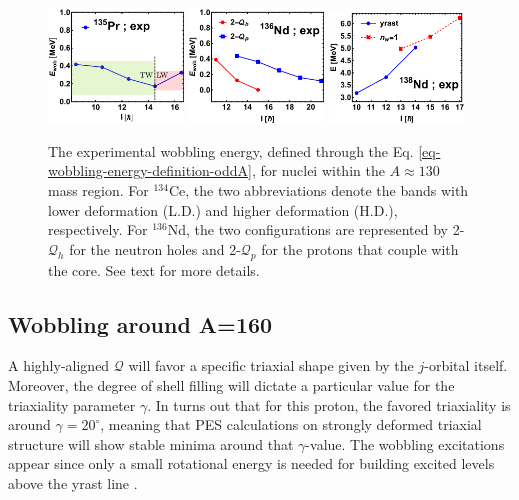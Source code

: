 \begin{figure}
    \includegraphics[width=0.32\textwidth]{Chapters/Figures/wobblers/135Pr-edited.pdf}
    \includegraphics[width=0.32\textwidth]{Chapters/Figures/wobblers/136Nd-joint.pdf}
    \includegraphics[width=0.32\textwidth]{Chapters/Figures/wobblers/138Nd.pdf}
    \caption{The experimental wobbling energy, defined through the Eq. \ref{eq-wobbling-energy-definition-oddA}, for nuclei within the $A\approx 130$ mass region. For $^{134}$Ce, the two abbreviations denote the bands with lower deformation (L.D.) and higher deformation (H.D.), respectively. For $^{136}$Nd, the two configurations are represented by 2-$\mathcal{Q}_h$ for the neutron holes and 2-$\mathcal{Q}_p$ for the protons that couple with the core. See text for more details.}
    \label{wobblers-exp-set2}
\end{figure}

\subsection{Wobbling around A=160}

A highly-aligned $\mathcal{Q}$ will favor a specific triaxial shape \cite{hamamoto1983intrinsic} given by the $j$-orbital itself. Moreover, the degree of shell filling will dictate a particular value for the triaxiality parameter $\gamma$. In turns out that for this proton, the favored triaxiality is around $\gamma=20^\circ$, meaning that PES calculations on strongly deformed triaxial structure will show stable minima around that $\gamma$-value. The wobbling excitations appear since only a small rotational energy is needed for building excited levels above the yrast line \cite{hamamoto2016interplay}.

